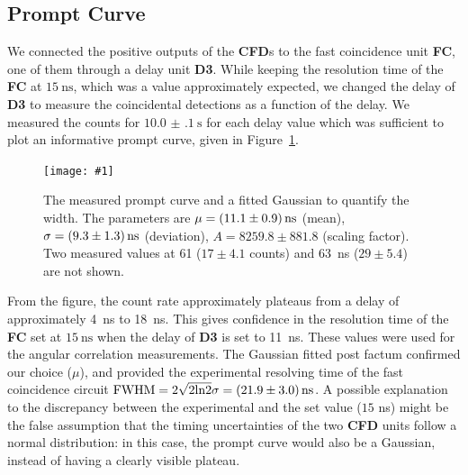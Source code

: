 \documentclass[twocolumn]{article}
\newcommand{\insertFigure}[1]{%
   \texttt{[image: \#1]}%
}
\begin{document}
\subsection{Prompt Curve}
We connected the positive outputs of the \textbf{CFD}s to the fast coincidence unit \textbf{FC}, one of them through a delay unit \textbf{D3}. While keeping the resolution time of the \textbf{FC} at $\SI{15}{\nano\second}$, which was a value approximately expected, we changed the delay of \textbf{D3} to measure the coincidental detections as a function of the delay. We measured the counts for $\SI[separate-uncertainty = true]{10.0(1) }{\second}$ for each delay value which was sufficient to plot an informative prompt curve, given in Figure~\ref{fig:prompt}.
\begin{figure}[!h]
	\centering
	\insertFigure{prompt_with_gauss.png}
	\caption{The measured prompt curve and a fitted Gaussian to quantify the width. The parameters are $\mu = \SI[separate-uncertainty = true]{11.1 \pm 0.9}{\nano\second}$ (mean), $\sigma = \SI[separate-uncertainty = true]{9.3 \pm 1.3}{\nano\second}$ (deviation), $A = 8259.8 \pm	881.8$ (scaling factor). Two measured values at 61 ($17 \pm 4.1$ counts) and 63~ns ($29 \pm 5.4$) are not shown.}
	\label{fig:prompt}
\end{figure}
From the figure, the count rate approximately plateaus from a delay of approximately 4~ns to 18~ns. This gives confidence in the resolution time of the \textbf{FC} set at $\SI{15}{\nano\second}$ when the delay of \textbf{D3} is set to 11~ns. These values were used for the angular correlation measurements. The Gaussian fitted post factum confirmed our choice ($\mu$), and provided the experimental resolving time of the fast coincidence circuit  $\text{FWHM} = 2 \sqrt{2 \text{ln}2} \sigma = \SI[separate-uncertainty = true]{21.9 \pm 3.0}{\nano \second}$\cite{signal}. A possible explanation to the discrepancy between the experimental and the set value ($15$ ns) might be the false assumption that the timing uncertainties of the two \textbf{CFD} units follow a normal distribution: in this case, the prompt curve would also be a Gaussian, instead of having a clearly visible plateau. 
\end{document}
